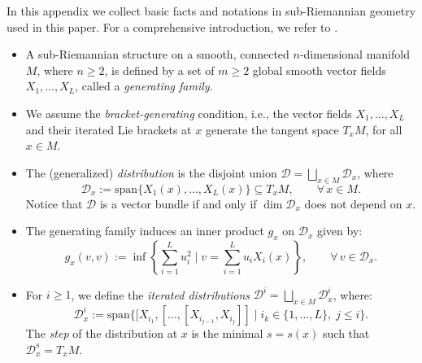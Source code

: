 \documentclass[11pt,a4paper]{article}
\theoremstyle{plain}
\theoremstyle{definition}
\theoremstyle{remark}
\numberwithin{equation}{section}
\newcommand{\distr}{\mathscr{D}}
\begin{document}
In this appendix we collect basic facts and notations in sub-Riemannian geometry used in this paper. For a comprehensive introduction, we refer to \cite{nostrolibro,riffordbook,montgomerybook}.

\begin{itemize}
\item A sub-Rieman\-nian structure on a smooth, connected $n$-dimensional manifold $M$, where $n\geq 2$, is defined by a set of $m\geq 2$ global smooth vector fields $X_{1},\ldots,X_{L}$, called a \emph{generating family}.
\item We assume the \emph{bracket-generating} condition, i.e., the vector fields $X_{1},\ldots,X_{L}$ and their iterated Lie brackets at $x$ generate the tangent space $T_x M$, for all $x\in M$.
\item The (generalized) \emph{distribution} is the disjoint union $\distr = \bigsqcup_{x\in M} \distr_x$, where 
\begin{equation}
\distr_{x}:=\mathrm{span}\{X_{1}(x),\ldots,X_{L}(x)\}\subseteq T_{x}M,\qquad \forall\, x\in M.
\end{equation}
Notice that $\distr$ is a vector bundle if and only if $\dim\distr_x$ does not depend on $x$.

\item The generating family induces an inner product $g_{x}$ on $\distr_{x}$ given by:
\begin{equation}
g_{x}(v,v):=\inf\left\{\sum_{i=1}^{L}u_{i}^{2}\mid v=\sum_{i=1}^{L}u_{i}X_{i}(x)\right\},\qquad \forall\, v\in \distr_x.
\end{equation}

\item For $i\geq 1$, we define the \emph{iterated distributions} $\distr^i=\bigsqcup_{x\in M}\distr^i_x$, where:
\[
\distr^{i}_{x}:=\mathrm{span}\{[X_{i_{1}},[\ldots,[X_{i_{j-1}},X_{i_{j}}]]\mid i_{k}\in \{1,\ldots,L\},\; j\leq i\}.
\]
The \emph{step} of the distribution at $x$ is the minimal $s=s(x)$ such that $\distr^{s}_{x}=T_{x}M$.


\end{itemize}
\end{document}

